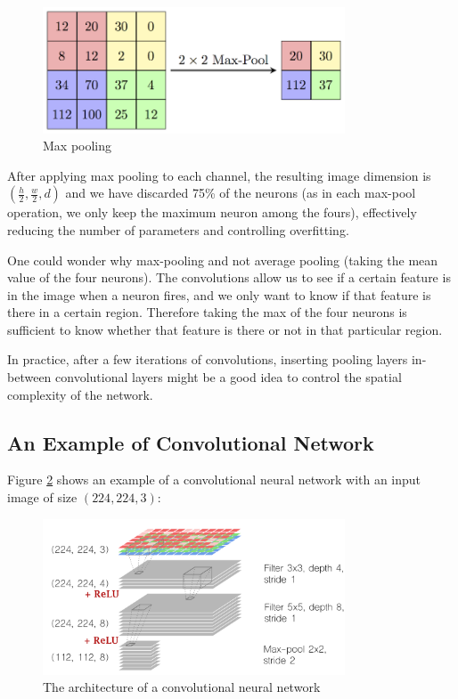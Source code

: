 \begin{figure}[H]
\centering
\includegraphics[width=0.8\textwidth]{Images/maxpool.png}
\caption{Max pooling \cite{camb-spark}}
\label{maxpool}
\end{figure}

After applying max pooling to each channel, the resulting image dimension is $(\frac{h}{2}, \frac{w}{2}, d)$ and we have discarded 75\% of the neurons (as in each max-pool operation, we only keep the maximum neuron among the fours), effectively reducing the number of parameters and controlling overfitting.

One could wonder why max-pooling and not average pooling (taking the mean value of the four neurons). The convolutions allow us to see if a certain feature is in the image when a neuron fires, and we only want to know if that feature is there in a certain region. Therefore taking the max of the four neurons is sufficient to know whether that feature is there or not in that particular region.

In practice, after a few iterations of convolutions, inserting pooling layers in-between convolutional layers might be a good idea to control the spatial complexity of the network.

\subsection{An Example of Convolutional Network}
Figure \ref{ex-convnet} shows an example of a convolutional neural network with an input image of size $(224, 224, 3)$:

\begin{figure}[H]
\centering
\includegraphics[width=0.8\textwidth]{Images/conv_archi.png}
\caption{The architecture of a convolutional neural network \cite{gorner}}
\label{ex-convnet}
\end{figure}

